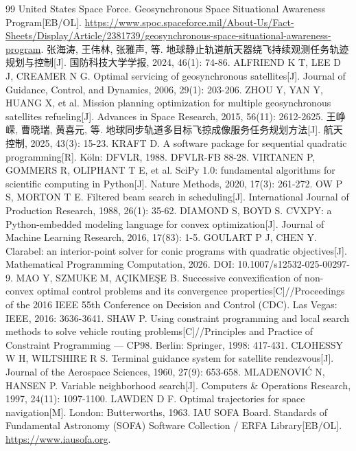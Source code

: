 \begin{thebibliography}{99}
\setlength{\itemsep}{2pt}
 United States Space Force. Geosynchronous Space Situational Awareness Program[EB/OL]. \url{https://www.spoc.spaceforce.mil/About-Us/Fact-Sheets/Display/Article/2381739/geosynchronous-space-situational-awareness-program}.
 张海涛, 王伟林, 张雅声, 等. 地球静止轨道航天器绕飞持续观测任务轨迹规划与控制[J]. 国防科技大学学报, 2024, 46(1): 74-86.
 ALFRIEND K T, LEE D J, CREAMER N G. Optimal servicing of geosynchronous satellites[J]. Journal of Guidance, Control, and Dynamics, 2006, 29(1): 203-206.
 ZHOU Y, YAN Y, HUANG X, et al. Mission planning optimization for multiple geosynchronous satellites refueling[J]. Advances in Space Research, 2015, 56(11): 2612-2625.
 王峥嵘, 曹晓瑞, 黄喜元, 等. 地球同步轨道多目标飞掠成像服务任务规划方法[J]. 航天控制, 2025, 43(3): 15-23.
 KRAFT D. A software package for sequential quadratic programming[R]. Köln: DFVLR, 1988. DFVLR-FB 88-28.
 VIRTANEN P, GOMMERS R, OLIPHANT T E, et al. SciPy 1.0: fundamental algorithms for scientific computing in Python[J]. Nature Methods, 2020, 17(3): 261-272.
 OW P S, MORTON T E. Filtered beam search in scheduling[J]. International Journal of Production Research, 1988, 26(1): 35-62.
 DIAMOND S, BOYD S. CVXPY: a Python-embedded modeling language for convex optimization[J]. Journal of Machine Learning Research, 2016, 17(83): 1-5.
 GOULART P J, CHEN Y. Clarabel: an interior-point solver for conic programs with quadratic objectives[J]. Mathematical Programming Computation, 2026. DOI: 10.1007/s12532-025-00297-9.
 MAO Y, SZMUKE M, AÇIKMEŞE B. Successive convexification of non-convex optimal control problems and its convergence properties[C]//Proceedings of the 2016 IEEE 55th Conference on Decision and Control (CDC). Las Vegas: IEEE, 2016: 3636-3641.
 SHAW P. Using constraint programming and local search methods to solve vehicle routing problems[C]//Principles and Practice of Constraint Programming — CP98. Berlin: Springer, 1998: 417-431.
 CLOHESSY W H, WILTSHIRE R S. Terminal guidance system for satellite rendezvous[J]. Journal of the Aerospace Sciences, 1960, 27(9): 653-658.
 MLADENOVIĆ N, HANSEN P. Variable neighborhood search[J]. Computers \& Operations Research, 1997, 24(11): 1097-1100.
 LAWDEN D F. Optimal trajectories for space navigation[M]. London: Butterworths, 1963.
 IAU SOFA Board. Standards of Fundamental Astronomy (SOFA) Software Collection / ERFA Library[EB/OL]. \url{https://www.iausofa.org}.
\end{thebibliography}
